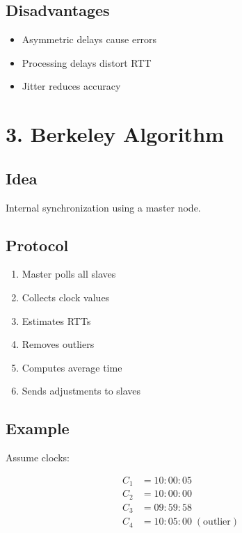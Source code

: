 \subsection{Disadvantages}

\begin{itemize}
    \item Asymmetric delays cause errors
    \item Processing delays distort RTT
    \item Jitter reduces accuracy
\end{itemize}


\section{3. Berkeley Algorithm}

\subsection{Idea}

Internal synchronization using a master node.

\subsection{Protocol}

\begin{enumerate}
    \item Master polls all slaves
    \item Collects clock values
    \item Estimates RTTs
    \item Removes outliers
    \item Computes average time
    \item Sends adjustments to slaves
\end{enumerate}



\subsection{Example}

Assume clocks:

\[
\begin{aligned}
C_1 &= 10:00:05 \\
C_2 &= 10:00:00 \\
C_3 &= 09:59:58 \\
C_4 &= 10:05:00 \; (\text{outlier})
\end{aligned}
\]

